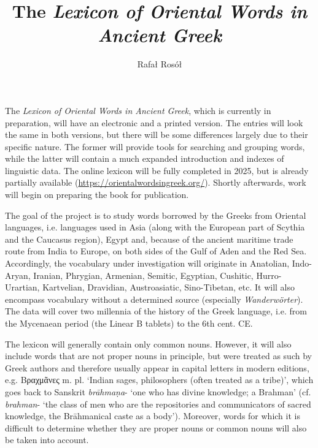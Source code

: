 \documentclass[output=paper,colorlinks,citecolor=brown,arabicfont,chinesefont]{langscibook}
\author{Rafał Rosół\affiliation{Adam Mickiewicz University in Poznań}}
\title{The \textit{Lexicon of Oriental Words in Ancient Greek}}
\begin{document}
 
\maketitle

The \emph{Lexicon of Oriental Words in Ancient Greek}, which is currently in preparation, will have an electronic and a printed version. The entries will look the same in both versions, but there will be some differences largely due to their specific nature. The former will provide tools for searching and grouping words, while the latter will contain a much expanded introduction and indexes of linguistic data. The online lexicon will be fully completed in 2025, but is already partially available (\url{https://orientalwordsingreek.org/}). Shortly afterwards, work will begin on preparing the book for publication.

The goal of the project is to study words borrowed by the Greeks from Oriental languages, i.e. languages used in Asia (along with the European part of Scythia and the Caucasus region), Egypt and, because of the ancient maritime trade route from India to Europe, on both sides of the Gulf of Aden and the Red Sea. Accordingly, the vocabulary under investigation will originate in Anatolian, Indo-Aryan, Iranian, Phrygian, Armenian, Semitic, Egyptian, Cushitic, Hurro-Urartian, Kartvelian, Dravidian, Austroasiatic, Sino-Tibetan, etc. It will also encompass vocabulary without a determined source (especially \emph{Wanderwörter}). The data will cover two millennia of the history of the Greek language, i.e. from the Mycenaean period (the Linear B tablets) to the 6th cent. CE.

The lexicon will generally contain only common nouns. However, it will also include words that are not proper nouns in principle, but were treated as such by Greek authors and therefore usually appear in capital letters in modern editions, e.g. Βραχμᾶνες m. pl. ‘Indian sages, philosophers (often treated as a tribe)’, which goes back to Sanskrit \emph{brāhmaṇa}- ‘one who has divine knowledge; a Brahman’ (cf. \emph{brahman}- ‘the class of men who are the repositories and communicators of sacred knowledge, the Brāhmanical caste as a body’). Moreover, words for which it is difficult to determine whether they are proper nouns or common nouns will also be taken into account.
\end{document}
